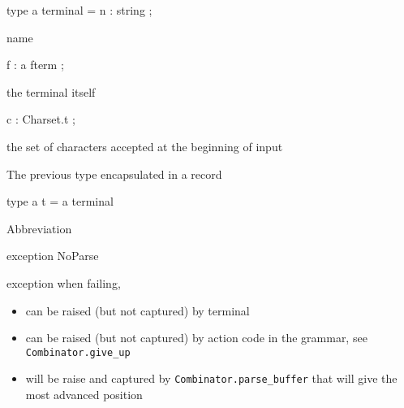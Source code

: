 \documentclass[11pt]{article}
\begin{document}
\label{type:Lex.terminal}\begin{ocamldoccode}
type {\textquotesingle}a terminal = 
{}  n : string ;
\end{ocamldoccode}
\begin{ocamldoccomment}
name


\end{ocamldoccomment}
\begin{ocamldoccode}
  f : {\textquotesingle}a fterm ;
\end{ocamldoccode}
\begin{ocamldoccomment}
the terminal itself


\end{ocamldoccomment}
\begin{ocamldoccode}
  c : Charset.t ;
\end{ocamldoccode}
\begin{ocamldoccomment}
the set of characters accepted
                                       at the beginning of input


\end{ocamldoccomment}
\begin{ocamldoccode}
{}
\end{ocamldoccode}
\begin{ocamldocdescription}
The previous type encapsulated in a record


\end{ocamldocdescription}




\label{type:Lex.t}\begin{ocamldoccode}
type {\textquotesingle}a t = {\textquotesingle}a terminal 
\end{ocamldoccode}
\begin{ocamldocdescription}
Abbreviation


\end{ocamldocdescription}




\label{exception:Lex.NoParse}\begin{ocamldoccode}
exception NoParse
\end{ocamldoccode}
\begin{ocamldocdescription}
exception when failing,\begin{itemize}
\item can be raised (but not captured) by terminal
\item can be raised (but not captured) by action code in the grammar,
      see {\tt{Combinator.give\_up}}
\item will be raise and captured by {\tt{Combinator.parse\_buffer}} that will give
      the most advanced position
\end{itemize}



\end{ocamldocdescription}
\end{document}
